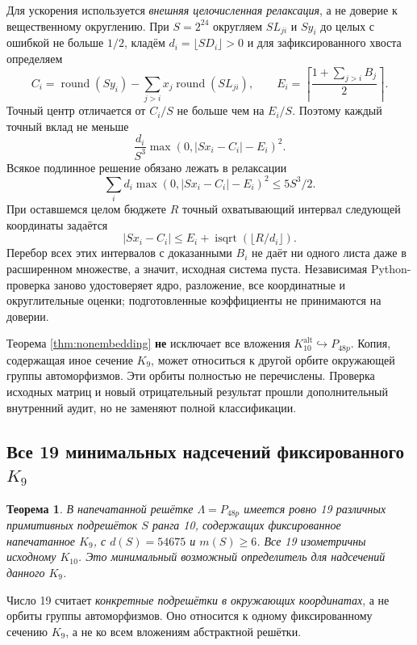 \documentclass[11pt,a4paper]{article}
\newtheorem{theorem}{Теорема}[section]
\theoremstyle{remark}\newtheorem{remark}[theorem]{Замечание}
\newcommand{\Kalt}{K_{10}^{\mathrm{alt}}}
\begin{document}
Для ускорения используется \emph{внешняя целочисленная релаксация}, а не доверие к вещественному округлению. При $S=2^{24}$ округляем $SL_{ji}$ и $Sy_i$ до целых с ошибкой не больше $1/2$, кладём $d_i=\lfloor SD_i\rfloor>0$ и для зафиксированного хвоста определяем
\[
C_i=\operatorname{round}(Sy_i)-\sum_{j>i}x_j\operatorname{round}(SL_{ji}),\qquad
E_i=\left\lceil\frac{1+\sum_{j>i}B_j}{2}\right\rceil.
\]
Точный центр отличается от $C_i/S$ не больше чем на $E_i/S$. Поэтому каждый точный вклад не меньше
\[
\frac{d_i}{S^3}\max(0,|Sx_i-C_i|-E_i)^2.
\]
Всякое подлинное решение обязано лежать в релаксации
\[
\sum_i d_i\max(0,|Sx_i-C_i|-E_i)^2\le5S^3/2.
\]
При оставшемся целом бюджете $R$ точный охватывающий интервал следующей координаты задаётся
\[
|Sx_i-C_i|\le E_i+\operatorname{isqrt}(\lfloor R/d_i\rfloor).
\]
Перебор всех этих интервалов с доказанными $B_i$ не даёт ни одного листа даже в расширенном множестве, а значит, исходная система пуста. Независимая Python-проверка заново удостоверяет ядро, разложение, все координатные и округлительные оценки; подготовленные коэффициенты не принимаются на доверии.

Теорема \ref{thm:nonembedding} \textbf{не} исключает все вложения $\Kalt\hookrightarrow P_{48p}$. Копия, содержащая иное сечение $K_9$, может относиться к другой орбите окружающей группы автоморфизмов. Эти орбиты полностью не перечислены. Проверка исходных матриц и новый отрицательный результат прошли дополнительный внутренний аудит, но не заменяют полной классификации.

\subsection{Все 19 минимальных надсечений фиксированного \texorpdfstring{$K_9$}{K9}}

\begin{theorem}\label{thm:nineteen}
В напечатанной решётке $\Lambda=P_{48p}$ имеется ровно 19 различных примитивных подрешёток $S$ ранга 10, содержащих фиксированное напечатанное $K_9$, с $d(S)=54675$ и $m(S)\ge6$. Все 19 изометричны исходному $K_{10}$. Это минимальный возможный определитель для надсечений данного $K_9$.
\end{theorem}

Число 19 считает \emph{конкретные подрешётки в окружающих координатах}, а не орбиты группы автоморфизмов. Оно относится к одному фиксированному сечению $K_9$, а не ко всем вложениям абстрактной решётки.
\end{document}
